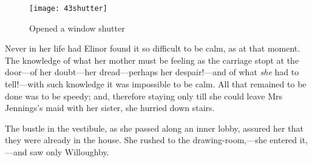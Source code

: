 \begin{letter}
	\begin{figure}[tbph]
		\centering
		\texttt{[image: 43shutter]}
		\caption{Opened a window shutter}
	\end{figure}
\end{letter}

Never in her life had Elinor found it so difficult to be calm, as at that moment. The knowledge of what her mother must be feeling as the carriage stopt at the door—of her doubt—her dread—perhaps her despair!—and of what \textit{she} had to tell!—with such knowledge it was impossible to be calm. All that remained to be done was to be speedy; and, therefore staying only till she could leave Mrs Jennings's maid with her sister, she hurried down stairs.

The bustle in the vestibule, as she passed along an inner lobby, assured her that they were already in the house. She rushed to the drawing-room,—she entered it,—and saw only Willoughby.